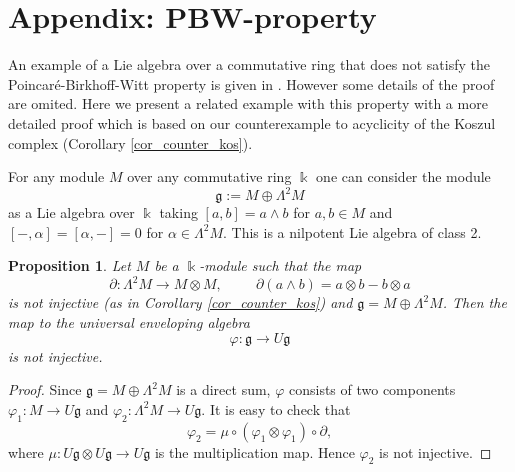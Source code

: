 \documentclass{amsart}
\numberwithin{equation}{section}
\newtheorem{proposition}[theorem]{Proposition}
\theoremstyle{definition}
\def\gg{\mathfrak{g}}
\def\kk{\Bbbk}
\begin{document}
\section{Appendix: PBW-property}

An example of a Lie algebra over a commutative ring that does not satisfy  the Poincar\'e-Birkhoff-Witt property is given in \cite[\S 5]{cohn1963remark}. However
some details of the proof are omited. Here we present a related example with this property with a more detailed proof which is based on our counterexample to acyclicity of the Koszul complex (Corollary  \ref{cor_counter_kos}). 

For any module $M$ over any commutative ring $\kk$ one can consider the module 
$$\gg:=M\oplus \Lambda^2 M$$ 
as a Lie algebra over $\kk$ taking $[a,b]=a\wedge b$ for $a,b\in M$ and $[-,\alpha]=[\alpha,-]=0$ for   $\alpha\in \Lambda^2M.$ This is a nilpotent Lie algebra of class 2.  

\begin{proposition}
 Let $M$ be a $\kk$-module such that the map $$\partial: \Lambda^2 M\to M\otimes M, \hspace{1cm} \partial(a\wedge b)= a\otimes b - b\otimes a$$ is not injective (as in Corollary \ref{cor_counter_kos}) and $\gg=M\oplus \Lambda^2 M$. Then the map to the universal enveloping algebra $$\varphi: \gg\to U\gg$$ is not injective. 
\end{proposition}
\begin{proof}  Since $\gg=M\oplus \Lambda^2 M$ is a direct sum, $\varphi$ consists of two components $\varphi_1:M\to U\gg$ and $\varphi_2:\Lambda^2 M \to U\gg.$ It is easy to check that 
$$\varphi_2=\mu \circ (\varphi_1\otimes \varphi_1)\circ \partial,$$
where $\mu:U\gg \otimes U\gg \to U\gg$ is the  multiplication map. 
Hence $\varphi_2$ is not injective.
\end{proof}
 





\printbibliography
\end{document}

